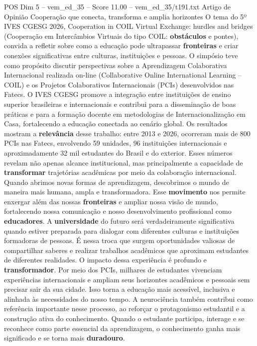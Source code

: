 \begin{textsample}{POS Dim 5 – vem\_ed\_35 – Score 11.00 – vem\_ed\_35/t191.txt}  \label{ex:f5_pos_007}
Artigo de Opinião Cooperação que conecta, transforma e amplia horizontes O tema do 5º IVES CGESG 2026, Cooperation in COIL Virtual Exchange: hurdles and bridges (Cooperação em Intercâmbios Virtuais do tipo COIL: \textbf{obstáculos} e pontes), convida a refletir sobre como a educação pode ultrapassar \textbf{fronteiras} e criar conexões significativas entre culturas, instituições e pessoas.
O simpósio teve como propósito discutir perspectivas sobre a Aprendizagem Colaborativa Internacional realizada on-line (Collaborative Online International Learning – COIL) e os Projetos Colaborativos Internacionais (PCIs) desenvolvidos nas Fatecs.
O IVES CGESG promove a integração entre instituições de ensino superior brasileiras e internacionais e contribui para a disseminação de boas práticas e para a formação docente em metodologias de Internacionalização em Casa, fortalecendo a educação conectada ao cenário global.
Os resultados mostram a \textbf{relevância} desse trabalho: entre 2013 e 2026, ocorreram mais de 800 PCIs nas Fatecs, envolvendo 59 unidades, 96 instituições internacionais e aproximadamente 32 mil estudantes do Brasil e do exterior.
Esses números revelam não apenas alcance institucional, mas principalmente a capacidade de \textbf{transformar} trajetórias acadêmicas por meio da colaboração internacional.
Quando abrimos novas formas de aprendizagem, descobrimos o mundo de maneira mais humana, ampla e transformadora.
Esse \textbf{movimento} nos permite enxergar além das nossas \textbf{fronteiras} e ampliar nossa visão de mundo, fortalecendo nossa comunicação e nosso desenvolvimento profissional como \textbf{educadores}.
A \textbf{universidade} do futuro será verdadeiramente significativa quando estiver preparada para dialogar com diferentes culturas e instituições formadoras de pessoas.
É nessa troca que surgem oportunidades valiosas de compartilhar saberes e realizar trabalhos acadêmicos que aproximam estudantes de diferentes realidades.
O impacto dessa experiência é profundo e \textbf{transformador}.
Por meio dos PCIs, milhares de estudantes vivenciam experiências internacionais e ampliam seus horizontes acadêmicos e pessoais sem precisar sair da sua cidade.
Isso torna a educação mais acessível, inclusiva e alinhada às necessidades do nosso tempo.
A neurociência também contribui como referência importante nesse processo, ao reforçar o protagonismo estudantil e a construção ativa do conhecimento.
Quando o estudante participa, interage e se reconhece como parte essencial da aprendizagem, o conhecimento ganha mais significado e se torna mais \textbf{duradouro}.

\end{textsample}
